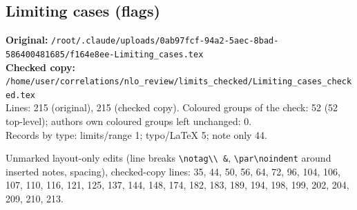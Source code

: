 \documentclass[10pt]{article}
\begin{document}
\subsection{Limiting cases (flags)}\label{sec:file-limiting_checked}
\noindent\textbf{Original:} \texttt{/root/.claude/uploads/0ab97fcf-94a2-5aec-8bad-586400481685/f164e8ee-Limiting\_cases.tex}\\\textbf{Checked copy:} \texttt{/home/user/correlations/nlo\_review/limits\_checked/Limiting\_cases\_checked.tex}\\
Lines: 215 (original), 215 (checked copy). Coloured groups of the check: 52 (52 top-level); author\textquotesingle s own coloured groups left unchanged: 0.\\
Records by type: limits/range 1; typo/LaTeX 5; note only 44.
\par\noindent Unmarked layout-only edits (line breaks \texttt{\textbackslash notag\textbackslash\textbackslash\ \&}, \texttt{\textbackslash par\textbackslash noindent} around inserted notes, spacing), checked-copy lines: 35, 44, 50, 56, 64, 72, 96, 104, 106, 107, 110, 116, 121, 125, 137, 144, 148, 174, 182, 183, 189, 194, 198, 199, 202, 204, 209, 210, 213.
\end{document}
